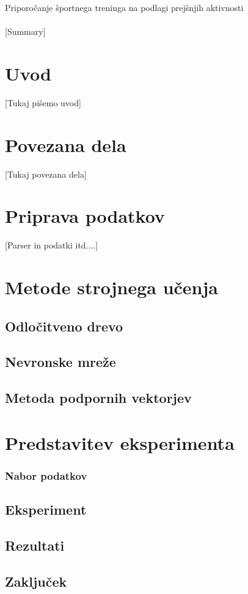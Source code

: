 \documentclass[a4paper,11pt]{article}
\begin{document}
\huge { Priporočanje športnega treninga na podlagi prejšnjih aktivnosti\\\\} 
\normalsize
[Summary]
\\

\begin{multicols}{2}

\section{Uvod}
[Tukaj pišemo uvod]

\section{Povezana dela}
[Tukaj povezana dela]

\section{Priprava podatkov}
[Parser in podatki itd....]

\section{Metode strojnega učenja}

\subsection{Odločitveno drevo}


\subsection{Nevronske mreže}


\subsection{Metoda podpornih vektorjev}



\section{Predstavitev eksperimenta}

\subsubsection{Nabor podatkov}


\subsection{Eksperiment}


\subsection{Rezultati}


\subsection{Zaključek}


\end{multicols}

\normalsize
\newpage

\begin{multicols}{2}


{}


\end{multicols}
\end{document}
